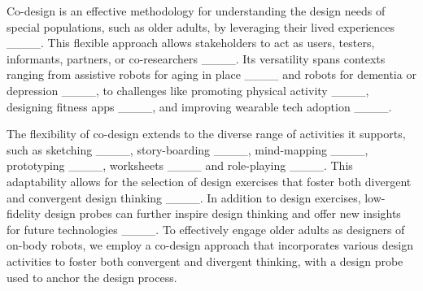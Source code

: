 Co-design is an effective methodology for understanding the design needs of special populations, such as older adults, by leveraging their lived experiences ____. This flexible approach allows stakeholders to act as users, testers, informants, partners, or co-researchers ____. Its versatility spans contexts ranging from assistive robots for aging in place ____ and robots for dementia or depression ____, to challenges like promoting physical activity ____, designing fitness apps ____, and improving wearable tech adoption ____.

The flexibility of co-design extends to the diverse range of activities it supports, such as sketching ____, story-boarding ____, mind-mapping ____, prototyping ____, worksheets ____ and role-playing ____. This adaptability allows for the selection of design exercises that foster both divergent and convergent design thinking ____. In addition to design exercises, low-fidelity design probes can further inspire design thinking and offer new insights for future technologies ____. To effectively engage older adults as designers of on-body robots, we employ a co-design approach that incorporates various design activities to foster both convergent and divergent thinking, with a design probe used to anchor the design process. 


